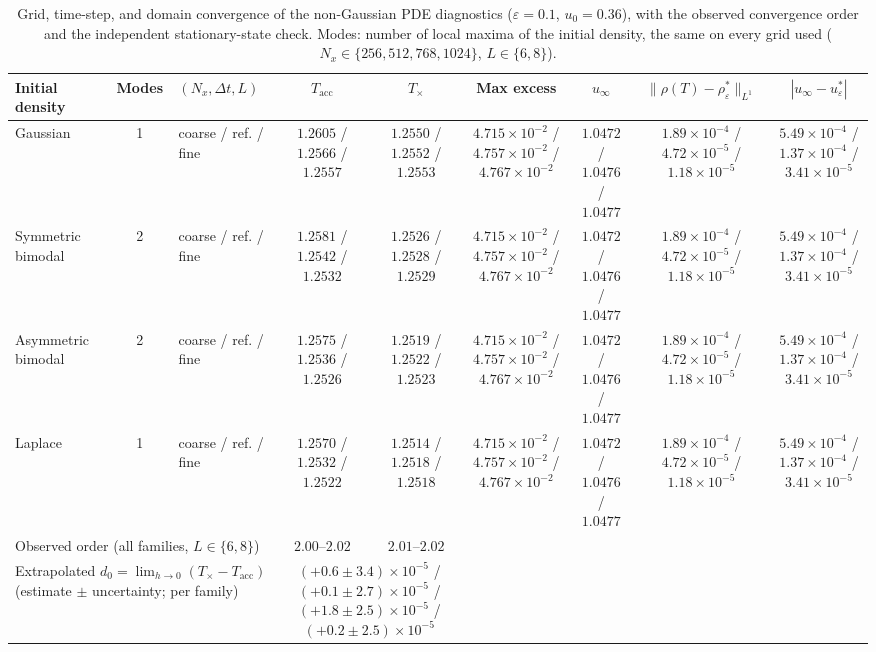 \begin{table}[htbp]
\centering
\small
\caption{Grid, time-step, and domain convergence of the non-Gaussian PDE diagnostics ($\varepsilon=0.1$, $u_{0}=0.36$), with the observed convergence order and the independent stationary-state check. Modes: number of local maxima of the initial density, the same on every grid used ($N_{x}\in\{256,512,768,1024\}$, $L\in\{6,8\}$).}
\label{tab:pde_convergence}
\begin{tabular}{lclcccccc}
\toprule
Initial density & Modes & $(N_x,\Delta t,L)$ & $T_{\mathrm{acc}}$ & $T_{\times}$ & Max excess & $u_{\infty}$ & $\|\rho(T)-\rho^{*}_{\varepsilon}\|_{L^{1}}$ & $|u_\infty-u^{*}_{\varepsilon}|$ \\
\midrule
Gaussian & 1 & coarse / ref. / fine & $1.2605$ / $1.2566$ / $1.2557$ & $1.2550$ / $1.2552$ / $1.2553$ & $4.715{\times}10^{-2}$ / $4.757{\times}10^{-2}$ / $4.767{\times}10^{-2}$ & $1.0472$ / $1.0476$ / $1.0477$ & $1.89{\times}10^{-4}$ / $4.72{\times}10^{-5}$ / $1.18{\times}10^{-5}$ & $5.49{\times}10^{-4}$ / $1.37{\times}10^{-4}$ / $3.41{\times}10^{-5}$ \\
Symmetric bimodal & 2 & coarse / ref. / fine & $1.2581$ / $1.2542$ / $1.2532$ & $1.2526$ / $1.2528$ / $1.2529$ & $4.715{\times}10^{-2}$ / $4.757{\times}10^{-2}$ / $4.767{\times}10^{-2}$ & $1.0472$ / $1.0476$ / $1.0477$ & $1.89{\times}10^{-4}$ / $4.72{\times}10^{-5}$ / $1.18{\times}10^{-5}$ & $5.49{\times}10^{-4}$ / $1.37{\times}10^{-4}$ / $3.41{\times}10^{-5}$ \\
Asymmetric bimodal & 2 & coarse / ref. / fine & $1.2575$ / $1.2536$ / $1.2526$ & $1.2519$ / $1.2522$ / $1.2523$ & $4.715{\times}10^{-2}$ / $4.757{\times}10^{-2}$ / $4.767{\times}10^{-2}$ & $1.0472$ / $1.0476$ / $1.0477$ & $1.89{\times}10^{-4}$ / $4.72{\times}10^{-5}$ / $1.18{\times}10^{-5}$ & $5.49{\times}10^{-4}$ / $1.37{\times}10^{-4}$ / $3.41{\times}10^{-5}$ \\
Laplace & 1 & coarse / ref. / fine & $1.2570$ / $1.2532$ / $1.2522$ & $1.2514$ / $1.2518$ / $1.2518$ & $4.715{\times}10^{-2}$ / $4.757{\times}10^{-2}$ / $4.767{\times}10^{-2}$ & $1.0472$ / $1.0476$ / $1.0477$ & $1.89{\times}10^{-4}$ / $4.72{\times}10^{-5}$ / $1.18{\times}10^{-5}$ & $5.49{\times}10^{-4}$ / $1.37{\times}10^{-4}$ / $3.41{\times}10^{-5}$ \\
\multicolumn{3}{l}{Observed order (all families, $L\in\{6,8\}$)} & $2.00$--$2.02$ & $2.01$--$2.02$ & & & & \\
\multicolumn{3}{l}{Extrapolated $d_{0}=\lim_{h\to0}(T_{\times}-T_{\mathrm{acc}})$ (estimate $\pm$ uncertainty; per family)} & \multicolumn{2}{c}{$(+0.6\pm3.4)\times10^{-5}$ / $(+0.1\pm2.7)\times10^{-5}$ / $(+1.8\pm2.5)\times10^{-5}$ / $(+0.2\pm2.5)\times10^{-5}$} & & & & \\
\bottomrule
\end{tabular}
\end{table}
